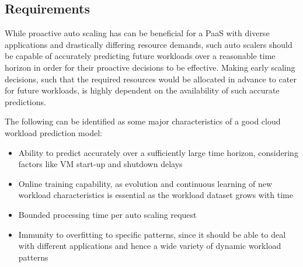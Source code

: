 \subsection{Requirements}
While proactive auto scaling has can be beneficial for a PaaS with diverse applications and drastically differing resource demands, such auto scalers should be capable of accurately predicting future workloads over a reasonable time horizon in order for their proactive decisions to be effective.
Making early scaling decisions, such that the required resources would be allocated in advance to cater for future workloads, is highly dependent on the availability of such accurate predictions.

The following can be identified as some major characteristics of a good cloud workload prediction model:

\begin{itemize}
\item Ability to predict accurately over a sufficiently large time horizon, considering factors like VM start-up and shutdown delays
\item Online training capability, as evolution and continuous learning of new workload characteristics is essential as the workload dataset grows with time
\item Bounded processing time per auto scaling request
\item Immunity to overfitting to specific patterns, since it should be able to deal with different applications and hence a wide variety of dynamic workload patterns
\end{itemize}
